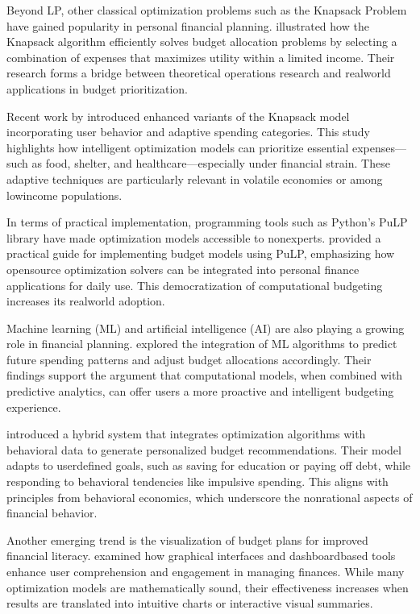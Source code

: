 \documentclass{article}
\begin{document}
Beyond LP, other classical optimization problems such as the Knapsack Problem have gained popularity in personal financial planning. \cite{martello2000knapsack} illustrated how the Knapsack algorithm efficiently solves budget allocation problems by selecting a combination of expenses that maximizes utility within a limited income. Their research forms a bridge between theoretical operations research and realworld applications in budget prioritization.

Recent work by \cite{mukesh2025knapsack} introduced enhanced variants of the Knapsack model incorporating user behavior and adaptive spending categories. This study highlights how intelligent optimization models can prioritize essential expenses—such as food, shelter, and healthcare—especially under financial strain. These adaptive techniques are particularly relevant in volatile economies or among lowincome populations.

In terms of practical implementation, programming tools such as Python’s PuLP library have made optimization models accessible to nonexperts. \cite{harrypatria2025pulp} provided a practical guide for implementing budget models using PuLP, emphasizing how opensource optimization solvers can be integrated into personal finance applications for daily use. This democratization of computational budgeting increases its realworld adoption.

Machine learning (ML) and artificial intelligence (AI) are also playing a growing role in financial planning. \cite{zhang2019mlbudgeting} explored the integration of ML algorithms to predict future spending patterns and adjust budget allocations accordingly. Their findings support the argument that computational models, when combined with predictive analytics, can offer users a more proactive and intelligent budgeting experience.

\cite{joo2020personalized} introduced a hybrid system that integrates optimization algorithms with behavioral data to generate personalized budget recommendations. Their model adapts to userdefined goals, such as saving for education or paying off debt, while responding to behavioral tendencies like impulsive spending. This aligns with principles from behavioral economics, which underscore the nonrational aspects of financial behavior.

Another emerging trend is the visualization of budget plans for improved financial literacy. \cite{navdeep2023visualbudget} examined how graphical interfaces and dashboardbased tools enhance user comprehension and engagement in managing finances. While many optimization models are mathematically sound, their effectiveness increases when results are translated into intuitive charts or interactive visual summaries.
\end{document}
